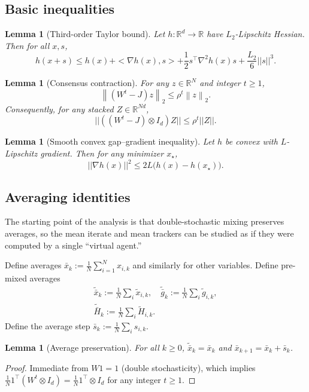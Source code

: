 \documentclass[10pt,twocolumn,letterpaper]{article}
\def\one{1}%
\def\J{J}%
\def\norm#1{||#1||}%
\def\ip#1#2{<#1,#2>}%
\theoremstyle{compact}
\newtheorem{lemma}[theorem]{Lemma}
\theoremstyle{compactremark}
\newcommand{\R}{\mathbb{R}}
\newcommand{\one}{\mathbf{1}}
\newcommand{\ip}[2]{\left\langle #1,#2\right\rangle}
\newcommand{\norm}[1]{\left\|#1\right\|}
\newcommand{\normtwo}[1]{\left\|#1\right\|_2}
\newcommand{\J}{\left(\frac{1}{N}\one\one^\top\right)}
\begin{document}
\subsection{Basic inequalities}\label{ssec:basic}
\begin{lemma}[Third-order Taylor bound]\label{lem:taylor3}
Let $h:\R^d\to\R$ have $L_2$-Lipschitz Hessian. Then for all $x,s$,
\[
h(x+s)\le h(x)+\ip{\nabla h(x)}{s}+\frac12 s^\top\nabla^2 h(x)s+\frac{L_2}{6}\norm{s}^3.
\]
\end{lemma}

\begin{lemma}[Consensus contraction]\label{lem:consensus}
For any $z\in\R^N$ and integer $t\ge 1$,
\[
\normtwo{(W^t-\J)z}\le \rho^t\normtwo{z}.
\]
Consequently, for any stacked $Z\in\R^{Nd}$,
\[
\norm{((W^t-\J)\otimes I_d)Z}\le \rho^t\norm{Z}.
\]
\end{lemma}

\begin{lemma}[Smooth convex gap--gradient inequality]\label{lem:gap-grad}
Let $h$ be convex with $L$-Lipschitz gradient. Then for any minimizer $x_\star$,
\[
\norm{\nabla h(x)}^2\le 2L\big(h(x)-h(x_\star)\big).
\]
\end{lemma}

\subsection{Averaging identities}\label{ssec:avg}
The starting point of the analysis is that double-stochastic mixing
preserves averages, so the mean iterate and mean trackers can be
studied as if they were computed by a single ``virtual agent.''

Define averages $\bar x_k:=\frac1N\sum_{i=1}^N x_{i,k}$ and similarly for other variables.
Define pre-mixed averages
\begin{gather*}
\tilde{\bar x}_k:=\tfrac1N\!\sum_i \tilde x_{i,k},\quad
\tilde{\bar g}_k:=\tfrac1N\!\sum_i \tilde g_{i,k},\\
\tilde{\bar H}_k:=\tfrac1N\!\sum_i \tilde H_{i,k}.
\end{gather*}
Define the average step $\bar s_k:=\frac1N\sum_i s_{i,k}$.

\begin{lemma}[Average preservation]\label{lem:avg-pres}
For all $k\ge0$, $\tilde{\bar x}_k=\bar x_k$ and $\bar x_{k+1}=\bar x_k+\bar s_k$.
\end{lemma}
\begin{proof}
Immediate from $W\one=\one$ (double stochasticity),
which implies $\frac1N\one^\top(W^t\otimes I_d)=\frac1N\one^\top\otimes I_d$
for any integer $t\ge 1$.
\end{proof}
\end{document}

